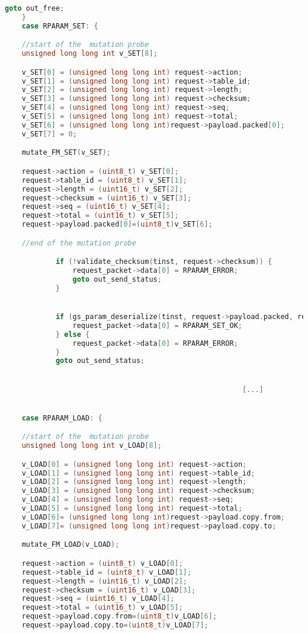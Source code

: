 \begin{lstlisting}[language=c]
            goto out_free;
	}
	case RPARAM_SET: {

    //start of the  mutation probe
    unsigned long long int v_SET[8];

    v_SET[0] = (unsigned long long int) request->action;
    v_SET[1] = (unsigned long long int) request->table_id;
    v_SET[2] = (unsigned long long int) request->length;
    v_SET[3] = (unsigned long long int) request->checksum;
    v_SET[4] = (unsigned long long int) request->seq;
    v_SET[5] = (unsigned long long int) request->total;
    v_SET[6] = (unsigned long long int)request->payload.packed[0];
    v_SET[7] = 0;

    mutate_FM_SET(v_SET);

    request->action = (uint8_t) v_SET[0];
    request->table_id = (uint8_t) v_SET[1];
    request->length = (uint16_t) v_SET[2];
    request->checksum = (uint16_t) v_SET[3];
    request->seq = (uint16_t) v_SET[4];
    request->total = (uint16_t) v_SET[5];
    request->payload.packed[0]=(uint8_t)v_SET[6];

    //end of the mutation probe

            if (!validate_checksum(tinst, request->checksum)) {
                request_packet->data[0] = RPARAM_ERROR;
                goto out_send_status;
            }


            if (gs_param_deserialize(tinst, request->payload.packed, request->length, F_FROM_BIG_ENDIAN) == GS_OK) {
                request_packet->data[0] = RPARAM_SET_OK;
            } else {
                request_packet->data[0] = RPARAM_ERROR;
            }
            goto out_send_status;


														[...]


	case RPARAM_LOAD: {

    //start of the  mutation probe
    unsigned long long int v_LOAD[8];

    v_LOAD[0] = (unsigned long long int) request->action;
    v_LOAD[1] = (unsigned long long int) request->table_id;
    v_LOAD[2] = (unsigned long long int) request->length;
    v_LOAD[3] = (unsigned long long int) request->checksum;
    v_LOAD[4] = (unsigned long long int) request->seq;
    v_LOAD[5] = (unsigned long long int) request->total;
    v_LOAD[6]= (unsigned long long int)request->payload.copy.from;
    v_LOAD[7]= (unsigned long long int)request->payload.copy.to;

    mutate_FM_LOAD(v_LOAD);

    request->action = (uint8_t) v_LOAD[0];
    request->table_id = (uint8_t) v_LOAD[1];
    request->length = (uint16_t) v_LOAD[2];
    request->checksum = (uint16_t) v_LOAD[3];
    request->seq = (uint16_t) v_LOAD[4];
    request->total = (uint16_t) v_LOAD[5];
    request->payload.copy.from=(uint8_t)v_LOAD[6];
    request->payload.copy.to=(uint8_t)v_LOAD[7];


\end{lstlisting}
